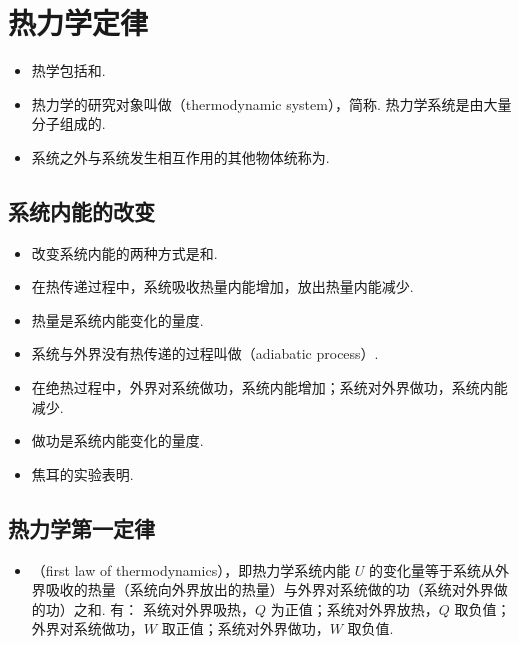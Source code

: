 \newpage
\section{热力学定律}

\vspace{10pt}
\begin{itemize}
\item 热学包括和.
\item 热力学的研究对象叫做（thermodynamic system），简称. 热力学系统是由大量分子组成的.
\item 系统之外与系统发生相互作用的其他物体统称为.
\end{itemize}

\subsection{系统内能的改变}
\vspace{10pt}
\begin{itemize}
\item 改变系统内能的两种方式是和.
\item 在热传递过程中，系统吸收热量内能增加，放出热量内能减少.
\item 热量是系统内能变化的量度.
\item 系统与外界没有热传递的过程叫做（adiabatic process）.
\item 在绝热过程中，外界对系统做功，系统内能增加；系统对外界做功，系统内能减少.
\item 做功是系统内能变化的量度.
\item 焦耳的实验表明.
\end{itemize}

\subsection{热力学第一定律}
\vspace{10pt}
\begin{itemize}
\item {}（first law of thermodynamics），即热力学系统内能 $U$ 的变化量等于系统从外界吸收的热量（系统向外界放出的热量）与外界对系统做的功（系统对外界做的功）之和. 有：
\newline 系统对外界吸热，$Q$ 为正值；系统对外界放热，$Q$ 取负值；外界对系统做功，$W$ 取正值；系统对外界做功，$W$ 取负值.
\end{itemize}

